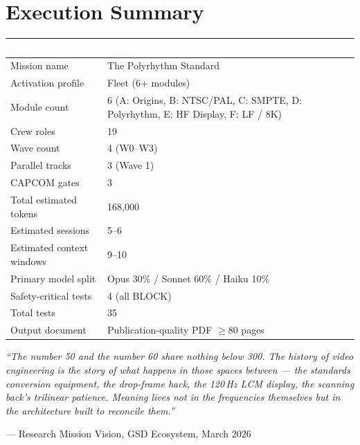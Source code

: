 \documentclass[11pt,letterpaper]{article}
\newcommand{\tableheader}[1]{\textbf{\sffamily\textcolor{white}{#1}}}
\begin{document}
\section{Execution Summary}

\begin{center}
\begin{tabularx}{\textwidth}{L{4cm}X}
\toprule
{}
\tableheader{Metric} & \tableheader{Value} \\
\midrule
Mission name & The Polyrhythm Standard \\
Activation profile & Fleet (6+ modules) \\
Module count & 6 (A: Origins, B: NTSC/PAL, C: SMPTE, D: Polyrhythm, E: HF Display, F: LF / 8K) \\
Crew roles & 19 \\
Wave count & 4 (W0--W3) \\
Parallel tracks & 3 (Wave 1) \\
CAPCOM gates & 3 \\
Total estimated tokens & 168,000 \\
Estimated sessions & 5--6 \\
Estimated context windows & 9--10 \\
Primary model split & Opus 30\% / Sonnet 60\% / Haiku 10\% \\
Safety-critical tests & 4 (all BLOCK) \\
Total tests & 35 \\
Output document & Publication-quality PDF $\geq$80 pages \\
\bottomrule
\end{tabularx}
\end{center}

\vspace{2em}
\begin{quotebox}
\textit{``The number 50 and the number 60 share nothing below 300. The history of video engineering
is the story of what happens in those spaces between --- the standards conversion equipment, the
drop-frame hack, the 120\,Hz LCM display, the scanning back's trilinear patience. Meaning lives
not in the frequencies themselves but in the architecture built to reconcile them.''}

\vspace{0.5em}
\hfill{\small\sffamily\textcolor{subtlegray}{--- Research Mission Vision, GSD Ecosystem, March 2026}}
\end{quotebox}
\end{document}
